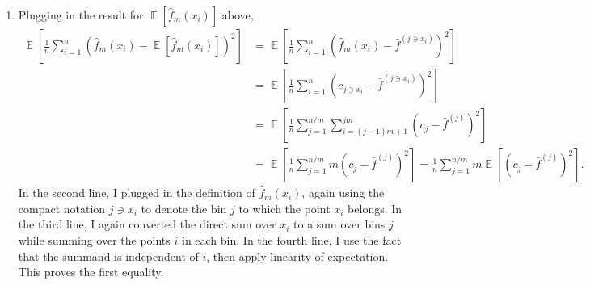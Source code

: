 \documentclass{article}
\DeclareMathOperator{\E}{\mathbb{E}}
\begin{document}
\begin{enumerate}
        \item Plugging in the result for $\E[\hat{f}_m(x_i)]$ above,
        \begin{align*}
                \E \left[ \frac{1}{n} \sum_{i=1}^n (\hat{f}_m(x_i) - \E[\hat{f}_m(x_i)])^2 \right]
                &= \E \left[ \frac{1}{n} \sum_{i=1}^n (\hat{f}_m(x_i) - \bar{f}^{(j \ni x_i)})^2 \right] \\
                &= \E \left[ \frac{1}{n} \sum_{i=1}^n (c_{j \ni x_i} - \bar{f}^{(j \ni x_i)})^2 \right] \\
                &= \E \left[ \frac{1}{n} \sum_{j=1}^{n/m} \sum_{i=(j-1)m+1}^{jm} (c_j - \bar{f}^{(j)})^2 \right] \\
                &= \E \left[ \frac{1}{n} \sum_{j=1}^{n/m} m (c_j - \bar{f}^{(j)})^2 \right] 
                = \frac{1}{n} \sum_{j=1}^{n/m} m \E \left[ (c_j - \bar{f}^{(j)})^2 \right].
        \end{align*}
        In the second line, I plugged in the definition of $\hat{f}_m(x_i)$, again using the compact notation $j \ni x_i$ to denote the bin $j$ to which the point $x_i$ belongs.
        In the third line, I again converted the direct sum over $x_i$ to a sum over bins $j$ while summing over the points $i$ in each bin.
        In the fourth line, I use the fact that the summand is independent of $i$, then apply linearity of expectation.
        This proves the first equality.


\end{enumerate}
\end{document}
